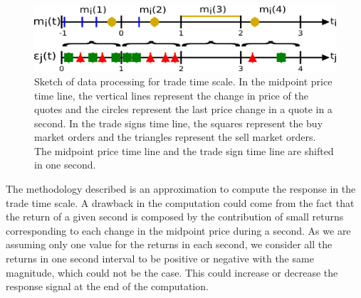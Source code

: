 \begin{figure}[htbp]
    \centering
    \includegraphics[width=\columnwidth]
    {figures/02_relation_trades_quotes_trade_scale.png}
    \caption{Sketch of data processing for trade time scale. In the midpoint
             price time line, the vertical lines represent the change in price
             of the quotes and the circles represent the last price change in a
             quote in a second. In the trade signs time line, the squares
             represent the buy market orders and the triangles represent the
             sell market orders. The midpoint price time line and the trade
             sign time line are shifted in one second.}
    \label{fig:relation_trades_midpoint_trade_scale}
\end{figure}

The methodology described is an approximation to compute the response in the
trade time scale. A drawback in the computation could come from the fact that
the return of a given second is composed by the contribution of small returns
corresponding to each change in the midpoint price during a second. As we are
assuming only one value for the returns in each second, we consider all the
returns in one second interval to be positive or negative with the same
magnitude, which could not be the case. This could increase or decrease the
response signal at the end of the computation.

